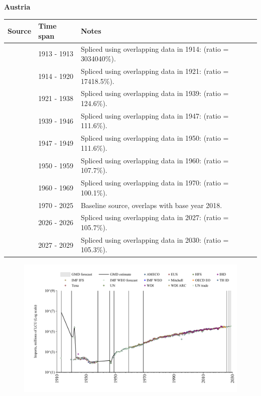 \documentclass[12pt,a4paper,landscape]{article}
\begin{document}
\begin{adjustbox}{max totalsize={\paperwidth}{\paperheight},center}
\begin{minipage}[t][\textheight][t]{\textwidth}
\vspace*{0.5cm}
{}
\begin{center}
{\Large\bfseries Austria}
\end{center}
\vspace{0.5cm}
\begin{table}[H]
\centering
\small
\begin{tabular}{|l|l|l|}
\hline
\textbf{Source} & \textbf{Time span} & \textbf{Notes} \\
\hline
\rowcolor{white}\cite{UN_trade}& 1913 - 1913 &Spliced using overlapping data in 1914: (ratio = 3034040\%).\\
\rowcolor{lightgray}\cite{Mitchell}& 1914 - 1920 &Spliced using overlapping data in 1921: (ratio = 17418.5\%).\\
\rowcolor{white}\cite{UN_trade}& 1921 - 1938 &Spliced using overlapping data in 1939: (ratio = 124.6\%).\\
\rowcolor{lightgray}\cite{HFS}& 1939 - 1946 &Spliced using overlapping data in 1947: (ratio = 111.6\%).\\
\rowcolor{white}\cite{Mitchell}& 1947 - 1949 &Spliced using overlapping data in 1950: (ratio = 111.6\%).\\
\rowcolor{lightgray}\cite{UN_trade}& 1950 - 1959 &Spliced using overlapping data in 1960: (ratio = 107.7\%).\\
\rowcolor{white}\cite{AMECO}& 1960 - 1969 &Spliced using overlapping data in 1970: (ratio = 100.1\%).\\
\rowcolor{lightgray}\cite{OECD_EO}& 1970 - 2025 &Baseline source, overlaps with base year 2018.\\
\rowcolor{white}\cite{AMECO}& 2026 - 2026 &Spliced using overlapping data in 2027: (ratio = 105.7\%).\\
\rowcolor{lightgray}\cite{IMF_WEO_forecast}& 2027 - 2029 &Spliced using overlapping data in 2030: (ratio = 105.3\%).\\
\hline
\end{tabular}
\end{table}
\begin{figure}[H]
\centering
\includegraphics[width=\textwidth,height=0.6\textheight,keepaspectratio]{graphs/AUT_imports.pdf}

\end{figure}
\end{minipage}
\end{adjustbox}
\end{document}
